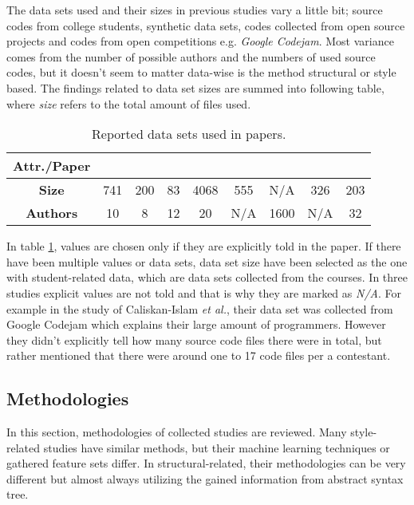 \documentclass[english]{tktltiki2}
\theoremstyle{definition}
\theoremstyle{remark}
\begin{document}
The data sets used and their sizes in previous studies vary a little bit; source codes from college students, synthetic data sets, codes collected from open source projects and codes from open competitions e.g. \textit{Google Codejam}.  Most variance comes from the number of possible authors and the numbers of used source codes, but it doesn't seem to matter data-wise is the method structural or style based. The findings related to data set sizes are summed into following table, where \textit{size} refers to the total amount of files used. 

\begin{table}[ht]
\centering
\begin{tabular}{c|cccccccc}
\textbf{Attr./Paper} & \cite{bandara2011machine}   & \cite{kothari2007probabilistic}   & \cite{Elenbogen:2008:DOS:1295109.1295123}  & \cite{lange2007using}    & \cite{Son:2013:APS:2508269.2508323}   & \cite{caliskan2015anonymizing}    & \cite{jadalla2008pde4java}   & \cite{rosenblum2011wrote}   \\ \hline
\textbf{Size}        & 741 & 200 & 83 & 4068 & 555 & N/A  & 326 & 203 \\
\textbf{Authors}     & 10  & 8   & 12 & 20   & N/A & 1600 & N/A & 32 
\end{tabular}
\caption{Reported data sets used in papers.}
\label{table:data}
\end{table}

\noindent
In table \ref{table:data}, values are chosen only if they are explicitly told in the paper. If there have been multiple values or data sets, data set size have been selected as the one with student-related data, which are data sets collected from the courses. In three studies explicit values are not told and that is why they are marked as \textit{N/A}. For example in the study of Caliskan-Islam \textit{et al.}, their data set was collected from Google Codejam which explains their large amount of programmers\cite{caliskan2015anonymizing}. However they didn't explicitly tell how many source code files there were in total, but rather mentioned that there were around one to 17 code files per a contestant.

\subsection{Methodologies}

In this section, methodologies of collected studies are reviewed. Many style-related studies have similar methods, but their machine learning techniques or gathered feature sets differ. In structural-related, their methodologies can be very different but almost always utilizing the gained information from abstract syntax tree. 
\end{document}
